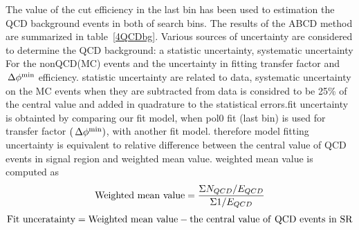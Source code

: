 The value of the cut efficiency 
in the last bin has been used to estimation the 
QCD background events in both of search bins. %
The results of the ABCD method are summarized in table~\ref{4QCDbg}. Various sources of uncertainty are considered 
 to determine the QCD background: a statistic uncertainty, systematic uncertainty
For the nonQCD(MC) events and the uncertainty in fitting transfer factor and $\,{\Delta\phi^{\rm min}}$ efficiency. statistic uncertainty are related to data,
systematic uncertainty on the MC events when they are subtracted from data is considred  
to be 25\% of the central value and added in quadrature to the                           
statistical errors.fit uncertainty 
 is obtainted by comparing our fit model, when pol0 fit (last bin) is used for transfer
factor $(\,{\Delta\phi^{\rm min}})$, with another fit model. therefore model fitting uncertainty is equivalent to  relative difference between 
the central value of QCD events in signal region and weighted mean value. weighted mean value is computed 
as 
\begin{equation}
{\rm Weighted~mean~value} =\frac{\Sigma N_{QCD}/E_{QCD}}{\Sigma 1/E_{QCD}}
\end{equation}
\begin{equation}
{\rm Fit~unceratainty} ={\rm Weighted~mean~value}-{\rm the~central~value~of~QCD~events~in~SR}
\end{equation}

